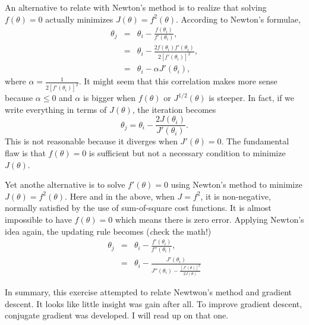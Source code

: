 An alternative to relate with Newton's method is to realize that solving $f(\theta)=0$ actually minimizes $J(\theta)=f^2(\theta)$. According to Newton's formulae,
\begin{eqnarray}
\theta_j&=&\theta_i-\frac{f(\theta_i)}{f'(\theta_i)},\\
	&=&\theta_i-\frac{2f(\theta_i)f'(\theta_i)}{2[f'(\theta_i)]^2},\\
	&=&\theta_i-\alpha J'(\theta_i),
\end{eqnarray}
where $\alpha=\frac{1}{2[f'(\theta_i)]^2}$. It might seem that this correlation makes more sense because $\alpha\leq 0$ and $\alpha$ is bigger when $f(\theta)$ or $J^{1/2}(\theta)$ is steeper. In fact, if we write everything in terms of $J(\theta)$, the iteration becomes
\begin{equation}
\theta_j=\theta_i-\frac{2J(\theta_i)}{J'(\theta_i)}.
\end{equation}
This is not reasonable because it diverges when $J'(\theta)=0$. The fundamental flaw is that $f(\theta)=0$ is sufficient but not a necessary condition to minimize $J(\theta)$. 

Yet anothe alternative is to solve $f'(\theta)=0$ using Newton's method to minimize $J(\theta)=f^2(\theta)$. Here and in the above, when $J=f^2$, it is non-negative, normally satisfied by the use of sum-of-square cost functions. It is almost impossible to have $f(\theta)=0$ which means there is zero error. Applying Newton's idea again, the updating rule becomes (\emph check the math!)
\begin{eqnarray}
\theta_j &=& \theta_i - \frac{f'(\theta_i)}{f''(\theta_i)},\\
	 &=& \theta_i - \frac{J'(\theta_i)}{J''(\theta_i)-\frac{[J'(\theta)]^2}{2J(\theta)}}
\end{eqnarray}

In summary, this exercise attempted to relate Newtwon's method and gradient descent. It looks like little insight was gain after all. To improve gradient descent, conjugate gradient was developed. I will read up on that one.
